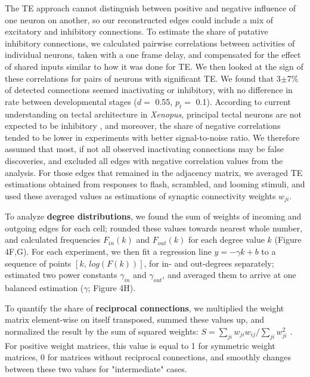 \documentclass{article}
\begin{document}
The TE approach cannot distinguish between positive and negative influence of one neuron on another, so our reconstructed edges could include a mix of excitatory and inhibitory connections. To estimate the share of putative inhibitory connections, we calculated pairwise correlations between activities of individual neurons, taken with a one frame delay, and compensated for the effect of shared inputs similar to how it was done for TE. We then looked at the sign of these correlations for pairs of neurons with significant TE. We found that 3$\pm$7\% of detected connections seemed inactivating or inhibitory, with no difference in rate between developmental stages ($d=$ 0.55, $p_t=$ 0.1). According to current understanding on tectal architecture in \textit{Xenopus}, principal tectal neurons are not expected to be inhibitory \citep{bell2011polyamines}, and moreover, the share of negative correlations tended to be lower in experiments with better signal-to-noise ratio. We therefore assumed that most, if not all observed inactivating connections may be false discoveries, and excluded all edges with negative correlation values from the analysis. For those edges that remained in the adjacency matrix, we averaged TE estimations obtained from responses to flash, scrambled, and looming stimuli, and used these averaged values as estimations of synaptic connectivity weights $w_{ji}$.

To analyze \textbf{degree distributions}, we found the sum of weights of incoming and outgoing edges for each cell; rounded these values towards nearest whole number, and calculated frequencies $F_{in}(k)$ and $F_{out}(k)$ for each degree value $k$ (Figure 4F,G). For each experiment, we then fit a regression line $y = -\gamma k + b$ to a sequence of points $[k , \, log(F(k)) ]$, for in- and out-degrees separately; estimated two power constants $\gamma_{in}$ and $\gamma_{out}$, and averaged them to arrive at one balanced estimation ($\gamma$; Figure 4H).

To quantify the share of \textbf{reciprocal connections}, we multiplied the weight matrix element-wise on itself transposed, summed these values up, and normalized the result by the sum of squared weights: $S=\sum_{ji}{w_{ji} w_{ij}} / \sum_{ji}{w_{ji}^2}$ . For positive weight matrices, this value is equal to 1 for symmetric weight matrices, 0 for matrices without reciprocal connections, and smoothly changes between these two values for "intermediate" cases.
\end{document}
